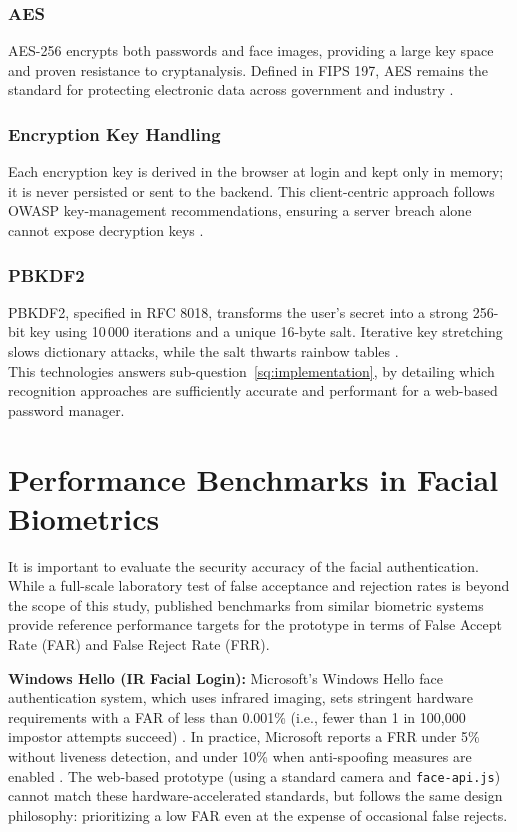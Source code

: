 \subsubsection{AES}  
AES-256 encrypts both passwords and face images, providing a large key space
and proven resistance to cryptanalysis.  Defined in FIPS 197, AES remains the standard for protecting electronic data across government and
industry \autocite{NISTFIPS197}. 

\clearpage

\subsubsection{Encryption Key Handling}  
Each encryption key is derived in the browser at login and kept only in
memory; it is never persisted or sent to the backend.  This client-centric
approach follows OWASP key-management recommendations, ensuring a server
breach alone cannot expose decryption keys
\autocite{OWASPKeyMgmt2025}. 

\subsubsection{PBKDF2}  
PBKDF2, specified in RFC 8018, transforms the user's secret into a strong
256-bit key using 10\,000 iterations and a unique 16-byte salt.  Iterative
key stretching slows dictionary attacks, while the salt thwarts rainbow
tables \autocite{RFC8018}.\\

This technologies answers sub-question~\ref{sq:implementation}, by detailing
which recognition approaches are sufficiently accurate and performant for
a web-based password manager.

\section{Performance Benchmarks in Facial Biometrics}
\label{sec:biometric-benchmarks}

It is important to evaluate the security accuracy of the facial authentication. While a full-scale laboratory test of false acceptance and rejection rates is beyond the scope of this study, published benchmarks from similar biometric systems provide reference performance targets for the prototype in terms of False Accept Rate (FAR) and False Reject Rate (FRR).

\textbf{Windows Hello (IR Facial Login):} Microsoft's Windows Hello face authentication system, which uses infrared imaging, sets stringent hardware requirements with a FAR of less than 0.001\% (i.e., fewer than 1 in 100{,}000 impostor attempts succeed) \autocite{MicrosoftHelloDocs}. In practice, Microsoft reports a FRR under 5\% without liveness detection, and under 10\% when anti-spoofing measures are enabled \autocite{MicrosoftHelloDocs}. The web-based prototype (using a standard camera and \texttt{face-api.js}) cannot match these hardware-accelerated standards, but follows the same design philosophy: prioritizing a low FAR even at the expense of occasional false rejects.

